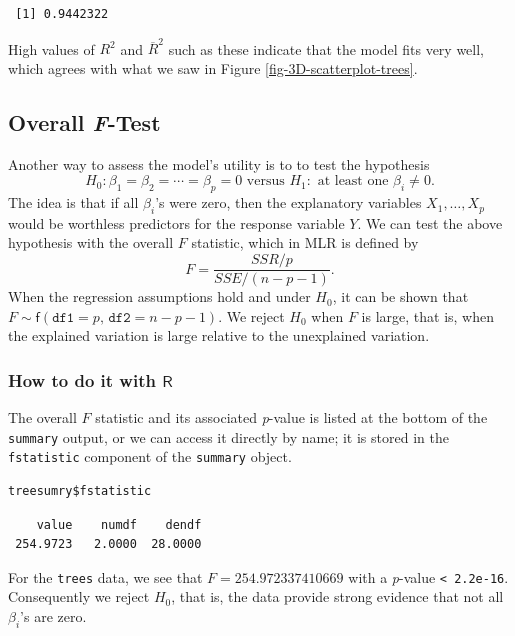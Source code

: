 \documentclass[captions=tableheading]{scrbook}
\begin{document}
\begin{verbatim}
 [1] 0.9442322
\end{verbatim}

High values of \(R^{2}\) and \( \overline{R}^2 \) such as these indicate that the model fits very well, which agrees with what we saw in Figure \ref{fig-3D-scatterplot-trees}.
\subsection{Overall \emph{F}-Test}
\label{sec-12-3-2}
\label{sub-mlr-Overall-F-Test}


Another way to assess the model's utility is to to test the hypothesis
\[
H_{0}:\beta_{1}=\beta_{2}=\cdots=\beta_{p}=0\mbox{ versus }H_{1}:\mbox{ at least one $\beta_{i}\neq0$}.
\]
The idea is that if all \(\beta_{i}\)'s were zero, then the explanatory variables \(X_{1},\ldots,X_{p}\) would be worthless predictors for the response variable \(Y\). We can test the above hypothesis with the overall \(F\) statistic, which in MLR is defined by
\begin{equation}
F=\frac{SSR/p}{SSE/(n-p-1)}.
\end{equation}
When the regression assumptions hold and under \(H_{0}\), it can be shown that \(F\sim\mathsf{f}(\mathtt{df1}=p,\,\mathtt{df2}=n-p-1)\). We reject \(H_{0}\) when \(F\) is large, that is, when the explained variation is large relative to the unexplained variation.
\subsubsection{How to do it with \(\mathsf{R}\)}
\label{sec-12-3-2-1}


The overall \(F\) statistic and its associated \emph{p}-value is listed at the bottom of the \texttt{summary} output, or we can access it directly by name; it is stored in the \texttt{fstatistic} component of the \texttt{summary} object. 


\lstset{language=R}
\begin{lstlisting}
treesumry$fstatistic
\end{lstlisting}

\begin{verbatim}
    value    numdf    dendf 
 254.9723   2.0000  28.0000
\end{verbatim}

For the \texttt{trees} data, we see that \( F =  254.972337410669 \) with a \emph{p}-value \texttt{< 2.2e-16}. Consequently we reject \(H_{0}\), that is, the data provide strong evidence that not all \(\beta_{i}\)'s are zero.
\end{document}
